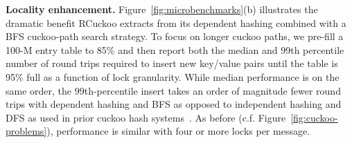 
\textbf{Locality enhancement.}
Figure~\ref{fig:microbenchmarks}(b) illustrates the dramatic benefit
RCuckoo extracts from its dependent hashing combined with a BFS
cuckoo-path search strategy.  To focus on longer cuckoo paths, we
pre-fill a 100-M entry table to 85\% and then report both the median
and 99th percentile number of round trips required to insert new
key/value pairs until the table is 95\% full as a function of lock
granularity.  While median performance is on the same order, the
99th-percentile insert takes an order of magnitude fewer round trips
with dependent hashing and BFS as opposed to independent hashing and
DFS as used in prior cuckoo hash
systems~\cite{cuckoo-improvements,pilaf,cuckoo}.  As before
(c.f. Figure~\ref{fig:cuckoo-problems}), performance is similar with
four or more locks per message.





